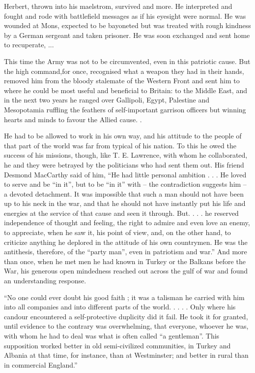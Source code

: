 Herbert, thrown into his maelstrom, survived and more. He interpreted and fought and rode with battlefield messages as if his eyesight were normal. He was wounded at Mons, expected to be bayoneted but was treated with rough kindness by a German sergeant and taken prisoner. He was soon exchanged and sent home to recuperate, ... 

This time the Army was not to be circumvented, even in this patriotic cause. But the high command,for once, recognised what a weapon they had in their hands, removed him from the bloody stalemate of the Western Front and sent him to where he could be most useful and beneficial to Britain: to the Middle East, and in the next two years he ranged over Gallipoli, Egypt, Palestine and Mesopotamia ruffling the feathers of self-important garrison officers but winning hearts and minds to favour the Allied cause. .

He had to be allowed to work in his own way, and his attitude to the people of that part of the world was far from typical of his nation. To this he owed the success of his missions, though, like T. E. Lawrence, with whom he collaborated, he and they were betrayed by the politicians who had sent them out. His friend Desmond MacCarthy said of him, “He had little personal ambition . . . He loved to serve and be “in it”, but to be “in it” with – the contradiction suggests him – a devoted detachment. It was impossible that such a man should not have been up to his neck in the war, and that he should not have instantly put his life and energies at the service of that cause and seen it through. But. . . . he reserved independence of thought and feeling, the right to admire and even love an enemy, to appreciate, when he saw it, his point of view, and, on the other hand, to criticize anything he deplored in the attitude of his own countrymen. He was the antithesis, therefore, of the “party man”, even in patriotism and war.” And more than once, when he met men he had known in Turkey or the Balkans before the War, his generous open mindedness reached out across the gulf of war and found an understanding response. 

“No one could ever doubt his good faith ; it was a talisman he carried with him into all companies and into different parts of the world. . . . . Only where his candour encountered a self-protective duplicity did it fail. He took it for granted, until evidence to the contrary was overwhelming, that everyone, whoever he was, with whom he had to deal was what is often called “a gentleman”. This supposition worked better in old semi-civilized communities, in Turkey and Albania at that time, for instance, than at Westminster; and better in rural than in commercial England.”

